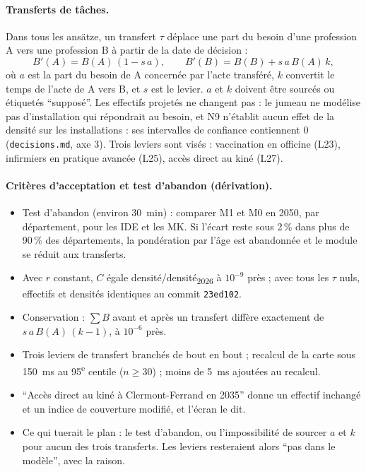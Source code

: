 \paragraph{Transferts de tâches.}
Dans tous les ansätze, un transfert $\tau$ déplace une part du besoin d'une profession A vers une profession B à partir de la date de décision :
\[
B'(A)=B(A)\,(1-s\,a),\qquad B'(B)=B(B)+s\,a\,B(A)\,k ,
\]
où $a$ est la part du besoin de A concernée par l'acte transféré, $k$ convertit le temps de l'acte de A vers B, et $s$ est le levier. $a$ et $k$ doivent être sourcés ou étiquetés \enquote{supposé}.
Les effectifs projetés ne changent pas : le jumeau ne modélise pas d'installation qui répondrait au besoin, et N9 n'établit aucun effet de la densité sur les installations : ses intervalles de confiance contiennent 0 (\texttt{decisions.md}, axe 3).
Trois leviers sont visés : vaccination en officine (L23), infirmiers en pratique avancée (L25), accès direct au kiné (L27).

\paragraph{Critères d'acceptation et test d'abandon (dérivation).}
\begin{itemize}
\item Test d'abandon (environ 30\suppose{}~min) : comparer M1 et M0 en 2050, par département, pour les IDE et les MK. Si l'écart reste sous 2\suppose{}\,\% dans plus de 90\suppose{}\,\% des départements, la pondération par l'âge est abandonnée et le module se réduit aux transferts.
\item Avec $r$ constant, $C$ égale densité/densité\textsubscript{2026} à $10^{-9}$\suppose{} près ; avec tous les $\tau$ nuls, effectifs et densités identiques au commit \texttt{23ed102}.
\item Conservation : $\sum B$ avant et après un transfert diffère exactement de $s\,a\,B(A)\,(k-1)$, à $10^{-6}$\suppose{} près.
\item Trois leviers de transfert branchés de bout en bout ; recalcul de la carte sous 150\suppose{}~ms au 95\textsuperscript{e} centile ($n\geq30$\suppose{}) ; moins de 5\suppose{}~ms ajoutées au recalcul.
\item \enquote{Accès direct au kiné à Clermont-Ferrand en 2035} donne un effectif inchangé et un indice de couverture modifié, et l'écran le dit.
\item Ce qui tuerait le plan : le test d'abandon, ou l'impossibilité de sourcer $a$ et $k$ pour aucun des trois transferts. Les leviers resteraient alors \enquote{pas dans le modèle}, avec la raison.
\end{itemize}

